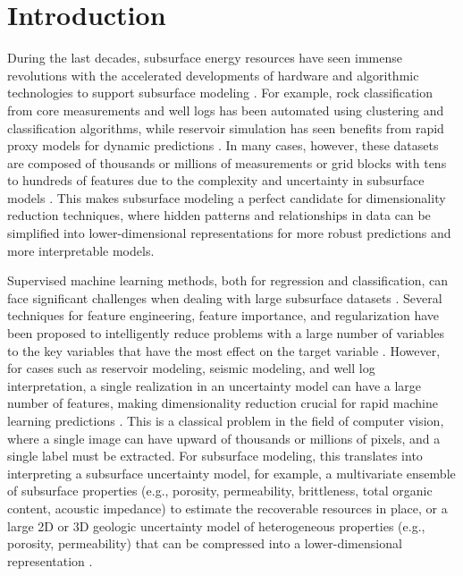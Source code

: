 \documentclass[a4paper,fleqn,12pt]{article}
\begin{document}
\section*{Introduction}
During the last decades, subsurface energy resources have seen immense revolutions with the accelerated developments of hardware and algorithmic technologies to support subsurface modeling \cite{mohammadpoor2020big, latrach2024critical}. For example, rock classification from core measurements and well logs has been automated using clustering and classification algorithms, while reservoir simulation has seen benefits from rapid proxy models for dynamic predictions \cite{raheem2024best, mao2024efficient, morales2024arc, morales2024abc}. In many cases, however, these datasets are composed of thousands or millions of measurements or grid blocks with tens to hundreds of features due to the complexity and uncertainty in subsurface models \cite{Rashid201321, 2021AGUFM.H25O1207S, mao2024cushion}. This makes subsurface modeling a perfect candidate for dimensionality reduction techniques, where hidden patterns and relationships in data can be simplified into lower-dimensional representations for more robust predictions and more interpretable models. 

Supervised machine learning methods, both for regression and classification, can face significant challenges when dealing with large subsurface datasets \cite{tariq2021systematic, sircar2021application}. Several techniques for feature engineering, feature importance, and regularization have been proposed to intelligently reduce problems with a large number of variables to the key variables that have the most effect on the target variable \cite{cai2018feature, zheng2018feature}. However, for cases such as reservoir modeling, seismic modeling, and well log interpretation, a single realization in an uncertainty model can have a large number of features, making dimensionality reduction crucial for rapid machine learning predictions \cite{misra2019machine, bhattacharya2021primer, morales2025anisotropic}. This is a classical problem in the field of computer vision, where a single image can have upward of thousands or millions of pixels, and a single label must be extracted. For subsurface modeling, this translates into interpreting a subsurface uncertainty model, for example, a multivariate ensemble of subsurface properties (e.g., porosity, permeability, brittleness, total organic content, acoustic impedance) to estimate the recoverable resources in place, or a large 2D or 3D geologic uncertainty model of heterogeneous properties (e.g., porosity, permeability) that can be compressed into a lower-dimensional representation \cite{morales2024stochastic, jiang2023use}.
\end{document}
